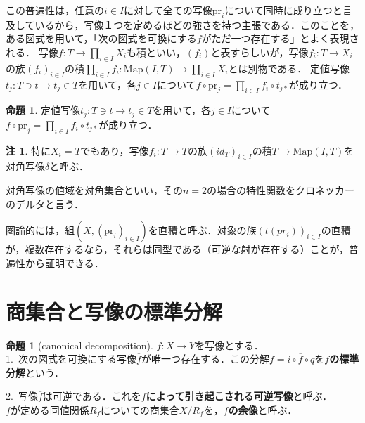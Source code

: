 \documentclass[uplatex, 12pt, dvipdfmx]{jsreport}
\theoremstyle{definition}
\newtheorem{proposition}[theorem]{命題}
\newtheorem{remark}[theorem]{注}
\theoremstyle{StatementsWithStar}
\theoremstyle{StatementsWithStar2}
\theoremstyle{StatementsWithStar3}
\theoremstyle{StatementsWithCCirc}
\theoremstyle{definition}
\begin{document}
この普遍性は，任意の$i\in I$に対して全ての写像$\mathrm{pr}_i$について同時に成り立つと言及しているから，写像１つを定めるほどの強さを持つ主張である．このことを，ある図式を用いて，「次の図式を可換にする$f$がただ一つ存在する」とよく表現される．
写像$f:T\to \prod_{i\in I}X_i$も積といい，$(f_i)$と表すらしいが，写像$f_i:T\to X_i$の族$(f_i)_{i\in I}$の積$\prod_{i\in I}f_i:\mathrm{Map}(I,T)\to\prod_{i\in I}X_i$とは別物である．
定値写像$t_j:T\ni t\to t_j\in T$を用いて，各$j\in I$について$f\circ\mathrm{pr}_j = \prod_{i\in I}f_i\circ t_{j*}$が成り立つ．
\begin{proposition}
    定値写像$t_j:T\ni t\to t_j\in T$を用いて，各$j\in I$について$f\circ\mathrm{pr}_j = \prod_{i\in I}f_i\circ t_{j*}$が成り立つ．
\end{proposition}
\begin{remark}
    特に$X_i=T$でもあり，写像$f_i:T\to T$の族$(id_T)_{i\in I}$の積$T\to\mathrm{Map}(I,T)$を対角写像$\delta$と呼ぶ．
    \begin{center}\end{center}
    対角写像の値域を対角集合といい，その$n=2$の場合の特性関数をクロネッカーのデルタと言う．
\end{remark}
圏論的には，組$(X, (\mathrm{pr}_i)_{i\in I})$を直積と呼ぶ．対象の族$(t(pr_i))_{i\in I}$の直積が，複数存在するなら，それらは同型である（可逆な射が存在する）ことが，普遍性から証明できる．

\section{商集合と写像の標準分解}

\begin{proposition}[canonical decomposition]
    $f:X\to Y$を写像とする．\\
    1.\, 次の図式を可換にする写像$\overline{f}$が唯一つ存在する．この分解$f=i\circ\overline{f}\circ q$を\textbf{$f$の標準分解}という．
    \begin{center}\end{center}
    2.\, 写像$\overline{f}$は可逆である．これを\textbf{$f$によって引き起こされる可逆写像}と呼ぶ．\\
    $f$が定める同値関係$R_f$についての商集合$X/R_f$を，\textbf{$f$の余像}と呼ぶ．
\end{proposition}
\end{document}

